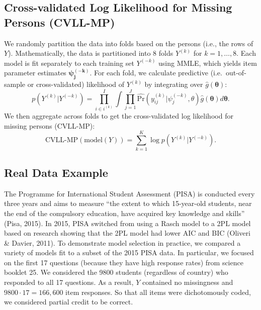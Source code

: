 \documentclass[
  english,
  man,floatsintext]{apa7}
\begin{document}
\hypertarget{cross-validated-log-likelihood-for-missing-persons-cvll-mp}{%
\subsection{Cross-validated Log Likelihood for Missing Persons (CVLL-MP)}\label{cross-validated-log-likelihood-for-missing-persons-cvll-mp}}

We randomly partition the data into folds based on the persons (i.e., the rows of \(Y\)). Mathematically, the data is partitioned into 8 folds \(Y^{(k)}\) for \(k = 1, \dots, 8\). Each model is fit separately to each training set \(Y^{(-k)}\) using MMLE, which yields item parameter estimates \(\bm{\psi_j^{(-k)}}\). For each fold, we calculate predictive (i.e.~out-of-sample or cross-validated) likelihood of \(Y^{(k)}\) by integrating over \(\hat g(\bm{\theta})\):
\begin{equation}
p(Y^{(k)} | Y^{(-k)}) = \prod_{i \in i^{(k)}}^{I} \int \prod_{j=1}^{J} \hat{\text{Pr}}(y_{ij}^{(k)} | \psi_j^{(-k)}, \theta) \hat g(\bm{\theta})d\bm{\theta}.
\end{equation}
We then aggregate across folds to get the cross-validated log likelihood for missing persons (CVLL-MP):
\begin{equation}
\text{CVLL-MP}(\text{model}(Y)) = \sum_{k = 1}^{K} \log p(Y^{(k)} | Y^{(-k)}).
\end{equation}

\hypertarget{real-data-example}{%
\subsection{Real Data Example}\label{real-data-example}}

The Programme for International Student Assessment (PISA) is conducted every three years and aims to measure ``the extent to which 15-year-old students, near the end of the compulsory education, have acquired key knowledge and skills'' (Pisa, 2015). In 2015, PISA switched from using a Rasch model to a 2PL model based on research showing that the 2PL model had lower AIC and BIC (Oliveri \& Davier, 2011). To demonstrate model selection in practice, we compared a variety of models fit to a subset of the 2015 PISA data. In particular, we focused on the first 17 questions (because they have high response rates) from science booklet 25. We considered the 9800 students (regardless of country) who responded to all 17 questions. As a result, \(Y\) contained no missingness and \(9800 \cdot 17 = 166,600\) item responses. So that all items were dichotomously coded, we considered partial credit to be correct.
\end{document}
